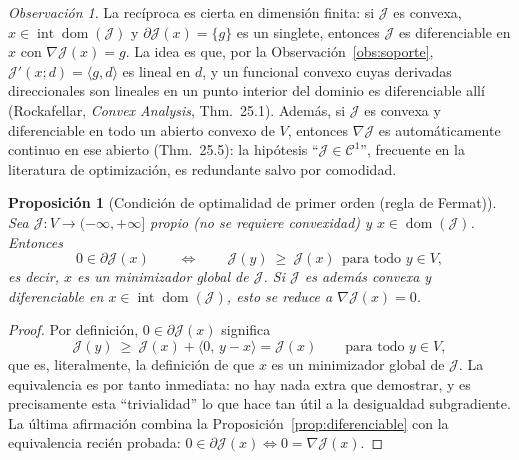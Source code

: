\documentclass[12pt]{book}
\theoremstyle{definition}
\theoremstyle{plain}
\newtheorem{proposicion}{Proposición}[section]
\theoremstyle{remark}
\newtheorem{observacion}{Observación}[section]
\begin{document}
\begin{observacion}
\label{obs:reciproco}
La rec\'iproca es cierta en dimensi\'on finita: si $\mathcal{J}$ es
convexa, $x\in\operatorname{int}\operatorname{dom}(\mathcal{J})$ y
$\partial\mathcal{J}(x)=\{g\}$ es un singlete, entonces
$\mathcal{J}$ es diferenciable en $x$ con $\nabla\mathcal{J}(x)=g$. La
idea es que, por la Observaci\'on~\ref{obs:soporte},
$\mathcal{J}'(x;d)=\langle g,d\rangle$ es lineal en $d$, y un funcional
convexo cuyas derivadas direccionales son lineales en un punto interior
del dominio es diferenciable all\'i (Rockafellar, \emph{Convex
Analysis}, Thm.~25.1). Adem\'as, si $\mathcal{J}$ es convexa y
diferenciable en todo un abierto convexo de $V$, entonces
$\nabla\mathcal{J}$ es autom\'aticamente continuo en ese abierto
(Thm.~25.5): la hip\'otesis ``$\mathcal{J}\in\mathcal{C}^{1}$'',
frecuente en la literatura de optimizaci\'on, es redundante salvo por
comodidad.
\end{observacion}

\begin{proposicion}[Condici\'on de optimalidad de primer orden
(regla de Fermat)]
\label{prop:fermat}
Sea $\mathcal{J}\colon V\to(-\infty,+\infty]$ propio (no se requiere
convexidad) y $x\in\operatorname{dom}(\mathcal{J})$. Entonces
\[
0\in\partial\mathcal{J}(x)
\qquad\Longleftrightarrow\qquad
\mathcal{J}(y)\ \ge\ \mathcal{J}(x)
\ \ \text{para todo } y\in V,
\]
es decir, $x$ es un minimizador \emph{global} de $\mathcal{J}$.
Si $\mathcal{J}$ es adem\'as convexa y diferenciable en
$x\in\operatorname{int}\operatorname{dom}(\mathcal{J})$, esto se reduce
a $\nabla\mathcal{J}(x)=0$.
\end{proposicion}

\begin{proof}
Por definici\'on, $0\in\partial\mathcal{J}(x)$ significa
\[
\mathcal{J}(y)\ \ge\
\mathcal{J}(x)+\langle 0,\,y-x\rangle=\mathcal{J}(x)
\qquad\text{para todo } y\in V,
\]
que es, literalmente, la definici\'on de que $x$ es un minimizador
global de $\mathcal{J}$. La equivalencia es por tanto inmediata: no hay
nada extra que demostrar, y es precisamente esta ``trivialidad'' lo que
hace tan \'util a la desigualdad subgradiente. La \'ultima afirmaci\'on
combina la Proposici\'on~\ref{prop:diferenciable} con la equivalencia
reci\'en probada:
$0\in\partial\mathcal{J}(x)\iff 0=\nabla\mathcal{J}(x)$.
\end{proof}
\end{document}
